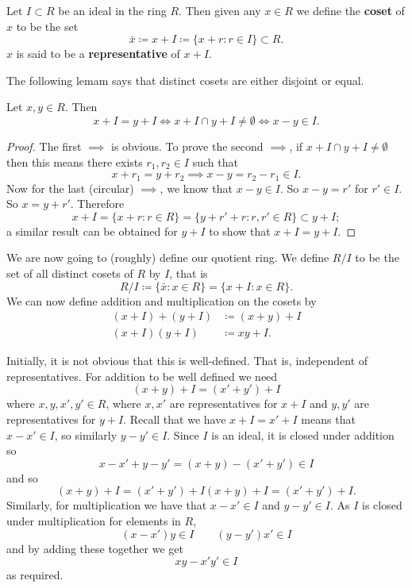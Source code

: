 
\begin{definition}[Coset]
    Let $I \subset R$ be an ideal in the ring $R$. Then given any $x \in R$ we define the \textbf{coset} of $x$ to be the set
    \[ \bar x \coloneqq x + I \coloneqq \{ x + r: r \in I \} \subset R. \]
    $x$ is said to be a \textbf{representative} of $x + I$.
\end{definition}

The following lemam says that distinct cosets are either disjoint or equal.

\begin{lemma}
    Let $x, y \in R$. Then
    \[ x + I = y + I \iff x + I \cap y + I \neq \emptyset \iff x - y \in I. \]
\end{lemma}

\begin{proof}
    The first $\implies$ is obvious. 
    To prove the second $\implies$, if $x + I \cap y + I \neq \emptyset$ then this means there exists $r_1, r_2 \in I$ such that
    \[ x + r_1 = y + r_2 \implies x - y = r_2 - r_1 \in I. \]
    Now for the last (circular) $\implies$, we know that $x - y \in I$. 
    So $x - y = r'$ for $r' \in I$. 
    So $x = y + r'$.
    Therefore
    \[ x + I = \{ x + r: r \in R \} = \{ y + r' + r: r, r' \in R\} \subset y + I; \]
    a similar result can be obtained for $y + I$ to show that $x + I = y + I$.
\end{proof}

We are now going to (roughly) define our quotient ring. We define $R/I$ to be the set of all distinct cosets of $R$ by $I$, that is
\[ R/I \coloneqq \{ \bar x: x \in R \} = \{ x + I: x \in R \}. \]
We can now define addition and multiplication on the cosets by
\begin{align*}
    (x + I) + (y + I) &\coloneqq (x + y) + I \\
    (x + I)   (y + I) &\coloneqq xy + I.
\end{align*}

Initially, it is not obvious that this is well-defined. 
That is, independent of representatives. 
For addition to be well defined we need
\[ (x + y) + I = (x' + y') + I \]
where $x, y, x', y' \in R$, where $x, x'$ are representatives for $x + I$ and $y, y'$ are representatives for $y + I$.
Recall that we have $x + I = x' + I$ means that $x - x' \in I$, so similarly $y - y' \in I$. 
Since $I$ is an ideal, it is closed under addition so 
\[ x - x' + y - y' = (x + y) - (x' + y') \in I \]
and so
\[ (x + y) + I = (x' + y') + I(x + y) + I = (x' + y') + I. \]
Similarly, for multiplication we have that $x - x' \in I$ and $y - y' \in I$. 
As $I$ is closed under multiplication for elements in $R$,
\[ (x - x')y \in I \qquad (y - y')x' \in I \]
and by adding these together we get
\[ xy - x'y' \in I \]
as required.

